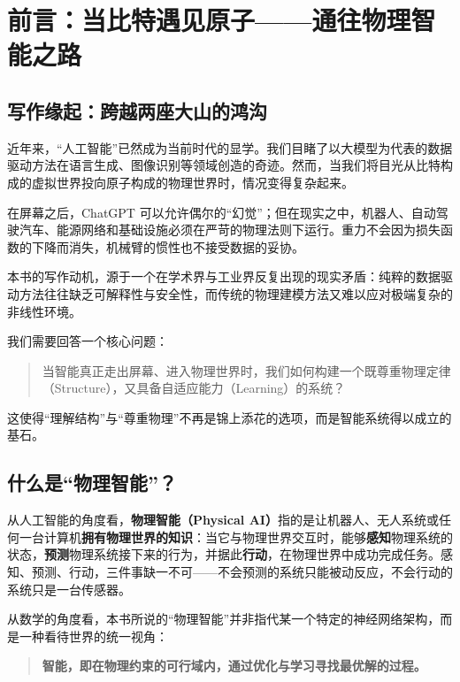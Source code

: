 \chapter*{前言：当比特遇见原子——通往物理智能之路}

\section*{写作缘起：跨越两座大山的鸿沟}

近年来，“人工智能”已然成为当前时代的显学。我们目睹了以大模型为代表的数据驱动方法在语言生成、图像识别等领域创造的奇迹。然而，当我们将目光从比特构成的虚拟世界投向原子构成的物理世界时，情况变得复杂起来。

在屏幕之后，ChatGPT 可以允许偶尔的“幻觉”；但在现实之中，机器人、自动驾驶汽车、能源网络和基础设施必须在严苛的物理法则下运行。重力不会因为损失函数的下降而消失，机械臂的惯性也不接受数据的妥协。

本书的写作动机，源于一个在学术界与工业界反复出现的现实矛盾：纯粹的数据驱动方法往往缺乏可解释性与安全性，而传统的物理建模方法又难以应对极端复杂的非线性环境。

我们需要回答一个核心问题：
\begin{quote}
当智能真正走出屏幕、进入物理世界时，我们如何构建一个既尊重物理定律（Structure），又具备自适应能力（Learning）的系统？
\end{quote}

这使得“理解结构”与“尊重物理”不再是锦上添花的选项，而是智能系统得以成立的基石。

\section*{什么是“物理智能”？}

从人工智能的角度看，\textbf{物理智能（Physical AI）}指的是让机器人、无人系统或任何一台计算机\textbf{拥有物理世界的知识}：当它与物理世界交互时，能够\textbf{感知}物理系统的状态，\textbf{预测}物理系统接下来的行为，并据此\textbf{行动}，在物理世界中成功完成任务。感知、预测、行动，三件事缺一不可——不会预测的系统只能被动反应，不会行动的系统只是一台传感器。

从数学的角度看，本书所说的“物理智能”并非指代某一个特定的神经网络架构，而是一种看待世界的统一视角：
\begin{quote}
\textbf{智能，即在物理约束的可行域内，通过优化与学习寻找最优解的过程。}
\end{quote}

